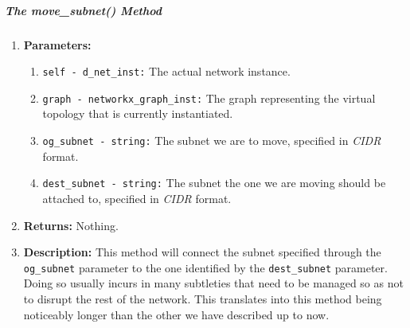     \subparagraph{The move\_subnet() Method}
        \begin{enumerate}
            \item \textbf{Parameters:}
            \begin{enumerate}
                \item \texttt{self - d\_net\_inst:} The actual network instance.
                \item \texttt{graph - networkx\_graph\_inst:} The graph representing the virtual topology that is currently instantiated.
                \item \texttt{og\_subnet - string:} The subnet we are to move, specified in \textit{CIDR} format.
                \item \texttt{dest\_subnet - string:} The subnet the one we are moving should be attached to, specified in \textit{CIDR} format.
            \end{enumerate}
            \item \textbf{Returns:} Nothing.
            \item \textbf{Description:} This method will connect the subnet specified through the \texttt{og\_subnet} parameter to the one identified by the \texttt{dest\_subnet} parameter. Doing so usually incurs in many subtleties that need to be managed so as not to disrupt the rest of the network. This translates into this method being noticeably longer than the other we have described up to now.
        \end{enumerate}


